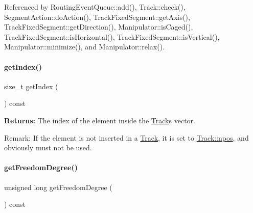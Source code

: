 Referenced by Routing\+Event\+Queue\+::add(), Track\+::check(), Segment\+Action\+::do\+Action(), Track\+Fixed\+Segment\+::get\+Axis(), Track\+Fixed\+Segment\+::get\+Direction(), Manipulator\+::is\+Caged(), Track\+Fixed\+Segment\+::is\+Horizontal(), Track\+Fixed\+Segment\+::is\+Vertical(), Manipulator\+::minimize(), and Manipulator\+::relax().

\mbox{\label{classKite_1_1TrackElement_ad65a47a8b8a83be5d0b456b1074d1220}} 
\paragraph{\texorpdfstring{get\+Index()}{getIndex()}}
{\footnotesize\ttfamily size\+\_\+t get\+Index (\begin{DoxyParamCaption}{ }\end{DoxyParamCaption}) const\hspace{0.3cm}{\ttfamily [inline]}}

{\bfseries Returns\+:} The index of the element inside the \hyperlink{classKite_1_1Track}{Track}\textquotesingle{}s vector.

\begin{DoxyParagraph}{Remark\+:}
If the element is not inserted in a \hyperlink{classKite_1_1Track}{Track}, it is set to \hyperlink{classKite_1_1Track_ae0070ea45b2592ce3701ab9e486e58a0}{Track\+::npos}, and obviously must not be used. 
\end{DoxyParagraph}
\mbox{\label{classKite_1_1TrackElement_aa7552c20cc46abcac558627b2ca341f8}} 
\paragraph{\texorpdfstring{get\+Freedom\+Degree()}{getFreedomDegree()}}
{\footnotesize\ttfamily unsigned long get\+Freedom\+Degree (\begin{DoxyParamCaption}{ }\end{DoxyParamCaption}) const\hspace{0.3cm}{\ttfamily [virtual]}}

